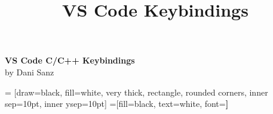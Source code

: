 \documentclass{article}
\title{VS Code Keybindings}
\begin{document}
\begin{center}{\huge{\textbf{VS Code C/C++ Keybindings}}}\\
{\large by Dani Sanz}
\end{center}
\begin{multicols*}{3}

 = [draw=black, fill=white, very thick,
    rectangle, rounded corners, inner sep=10pt, inner ysep=10pt]
 =[fill=black, text=white, font=\bfseries]

\end{multicols*}
\end{document}
